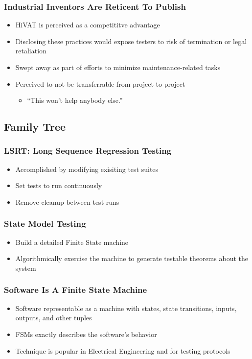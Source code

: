 \begin{frame}
  \frametitle{Industrial Inventors Are Reticent To Publish}
  \begin{itemize}
    \item HiVAT is perceived as a competititve advantage
    \item Disclosing these practices would expose testers to risk of termination or legal retaliation
    \item Swept away as part of efforts to minimize maintenance-related tasks
    \item Perceived to not be transferrable from project to project
    \begin{itemize}
      \item ``This won't help anybody else.''
    \end{itemize}
  \end{itemize}
\end{frame}

\subsection{Family Tree}

\begin{frame}
  \frametitle{LSRT: Long Sequence Regression Testing}
  \begin{itemize}
    \item Accomplished by modifying exisiting test suites
    \item Set tests to run continuously
    \item Remove cleanup between test runs
  \end{itemize}
\end{frame}

\begin{frame}
  \frametitle{State Model Testing}
  \begin{itemize}
    \item Build a detailed Finite State machine
    \item Algorithmically exercise the machine to generate testable theorems about the system
  \end{itemize}
  \citep{lee1996principles}
\end{frame}

\begin{frame}
  \frametitle{Software Is A Finite State Machine}
  \begin{itemize}
    \item Software representable as a machine with states, state transitions, inputs, outputs, and other tuples
    \item FSMs exactly describes the software's behavior
    \item Technique is popular in Electrical Engineering and for testing protocols
  \end{itemize}
\end{frame}


